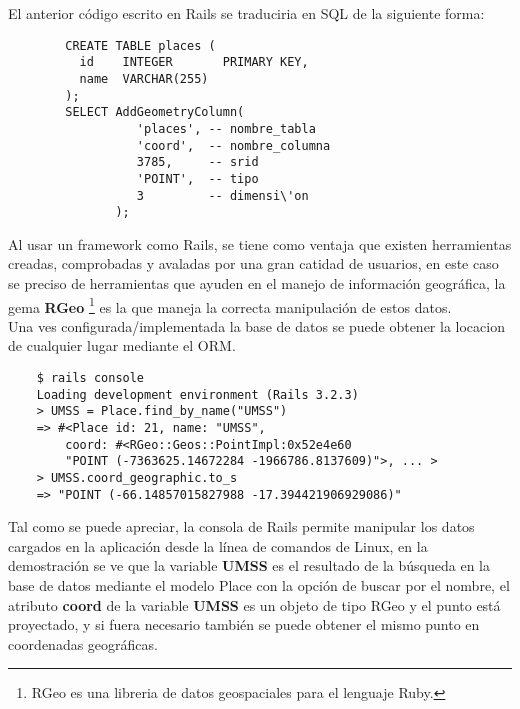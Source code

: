     El anterior código escrito en Rails se traduciria en SQL de la siguiente forma: 
    \begin{center}
      \begin{verbatim}
        CREATE TABLE places (
          id    INTEGER       PRIMARY KEY,
          name  VARCHAR(255)
        );
        SELECT AddGeometryColumn(
                  'places', -- nombre_tabla
                  'coord',  -- nombre_columna
                  3785,     -- srid
                  'POINT',  -- tipo
                  3         -- dimensi\'on
               );
      \end{verbatim}
    \end{center}
    Al usar un framework como Rails, se tiene como ventaja que existen herramientas creadas, comprobadas y avaladas por una gran catidad de usuarios, en este caso se preciso de herramientas que ayuden en el  manejo de informaci\'on geogr\'afica, la gema \textbf{RGeo} \footnote{ RGeo es una libreria de datos geospaciales  para el lenguaje Ruby.} es la que maneja  la correcta manipulaci\'on de estos datos.\\

    Una ves configurada/implementada la base de datos se puede obtener la locacion de cualquier lugar mediante el ORM.

\begin{center}
  \begin{verbatim}
    $ rails console
    Loading development environment (Rails 3.2.3)
    > UMSS = Place.find_by_name("UMSS")
    => #<Place id: 21, name: "UMSS", 
        coord: #<RGeo::Geos::PointImpl:0x52e4e60 
        "POINT (-7363625.14672284 -1966786.8137609)">, ... >
    > UMSS.coord_geographic.to_s
    => "POINT (-66.14857015827988 -17.394421906929086)"
  \end{verbatim}
\end{center}

    Tal como se puede apreciar, la consola de Rails permite manipular los datos cargados en la aplicación desde la línea de comandos de Linux, en la demostración se ve que la variable \textbf{UMSS}  es el resultado de la búsqueda en la base de datos mediante el modelo Place con la opción de buscar por el nombre, el atributo \textbf{coord} de la variable \textbf{UMSS} es un objeto de tipo RGeo y  el punto está proyectado, y si fuera necesario también se puede obtener el mismo punto en coordenadas geográficas.\\

